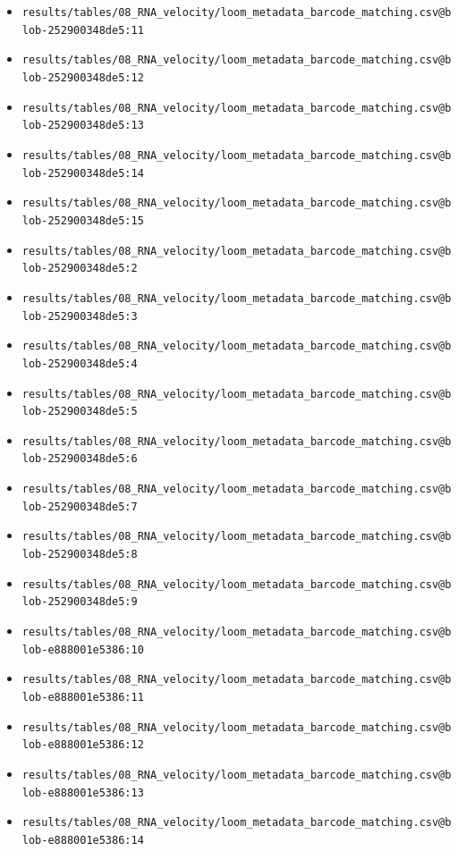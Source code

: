 \documentclass[
]{article}
\begin{document}
\begin{itemize}
\item
  \texttt{results/tables/08\_RNA\_velocity/loom\_metadata\_barcode\_matching.csv@blob-252900348de5:11}
\item
  \texttt{results/tables/08\_RNA\_velocity/loom\_metadata\_barcode\_matching.csv@blob-252900348de5:12}
\item
  \texttt{results/tables/08\_RNA\_velocity/loom\_metadata\_barcode\_matching.csv@blob-252900348de5:13}
\item
  \texttt{results/tables/08\_RNA\_velocity/loom\_metadata\_barcode\_matching.csv@blob-252900348de5:14}
\item
  \texttt{results/tables/08\_RNA\_velocity/loom\_metadata\_barcode\_matching.csv@blob-252900348de5:15}
\item
  \texttt{results/tables/08\_RNA\_velocity/loom\_metadata\_barcode\_matching.csv@blob-252900348de5:2}
\item
  \texttt{results/tables/08\_RNA\_velocity/loom\_metadata\_barcode\_matching.csv@blob-252900348de5:3}
\item
  \texttt{results/tables/08\_RNA\_velocity/loom\_metadata\_barcode\_matching.csv@blob-252900348de5:4}
\item
  \texttt{results/tables/08\_RNA\_velocity/loom\_metadata\_barcode\_matching.csv@blob-252900348de5:5}
\item
  \texttt{results/tables/08\_RNA\_velocity/loom\_metadata\_barcode\_matching.csv@blob-252900348de5:6}
\item
  \texttt{results/tables/08\_RNA\_velocity/loom\_metadata\_barcode\_matching.csv@blob-252900348de5:7}
\item
  \texttt{results/tables/08\_RNA\_velocity/loom\_metadata\_barcode\_matching.csv@blob-252900348de5:8}
\item
  \texttt{results/tables/08\_RNA\_velocity/loom\_metadata\_barcode\_matching.csv@blob-252900348de5:9}
\item
  \texttt{results/tables/08\_RNA\_velocity/loom\_metadata\_barcode\_matching.csv@blob-e888001e5386:10}
\item
  \texttt{results/tables/08\_RNA\_velocity/loom\_metadata\_barcode\_matching.csv@blob-e888001e5386:11}
\item
  \texttt{results/tables/08\_RNA\_velocity/loom\_metadata\_barcode\_matching.csv@blob-e888001e5386:12}
\item
  \texttt{results/tables/08\_RNA\_velocity/loom\_metadata\_barcode\_matching.csv@blob-e888001e5386:13}
\item
  \texttt{results/tables/08\_RNA\_velocity/loom\_metadata\_barcode\_matching.csv@blob-e888001e5386:14}

\end{itemize}
\end{document}
